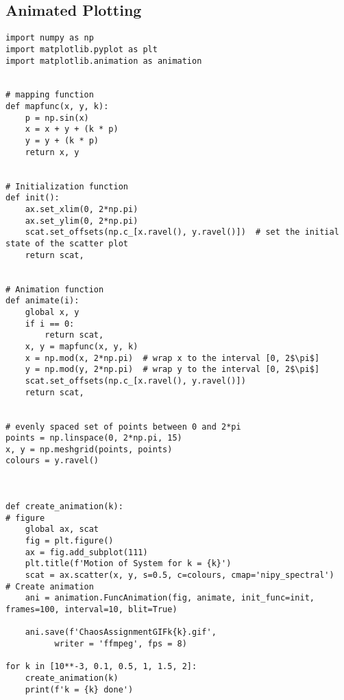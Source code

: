 \documentclass{article}
\begin{document}
\subsection{Animated Plotting}
\begin{lstlisting}
import numpy as np
import matplotlib.pyplot as plt
import matplotlib.animation as animation


# mapping function
def mapfunc(x, y, k):
    p = np.sin(x)
    x = x + y + (k * p)
    y = y + (k * p)
    return x, y


# Initialization function
def init():
    ax.set_xlim(0, 2*np.pi)
    ax.set_ylim(0, 2*np.pi)
    scat.set_offsets(np.c_[x.ravel(), y.ravel()])  # set the initial state of the scatter plot
    return scat,


# Animation function
def animate(i):
    global x, y
    if i == 0:
        return scat,
    x, y = mapfunc(x, y, k)
    x = np.mod(x, 2*np.pi)  # wrap x to the interval [0, 2$\pi$]
    y = np.mod(y, 2*np.pi)  # wrap y to the interval [0, 2$\pi$]
    scat.set_offsets(np.c_[x.ravel(), y.ravel()])
    return scat,


# evenly spaced set of points between 0 and 2*pi
points = np.linspace(0, 2*np.pi, 15)
x, y = np.meshgrid(points, points)
colours = y.ravel()



def create_animation(k):
# figure
    global ax, scat
    fig = plt.figure()
    ax = fig.add_subplot(111)
    plt.title(f'Motion of System for k = {k}')
    scat = ax.scatter(x, y, s=0.5, c=colours, cmap='nipy_spectral')
# Create animation
    ani = animation.FuncAnimation(fig, animate, init_func=init, frames=100, interval=10, blit=True)

    ani.save(f'ChaosAssignmentGIFk{k}.gif',  
          writer = 'ffmpeg', fps = 8) 
    
for k in [10**-3, 0.1, 0.5, 1, 1.5, 2]:
    create_animation(k)
    print(f'k = {k} done')
\end{lstlisting}
\end{document}
